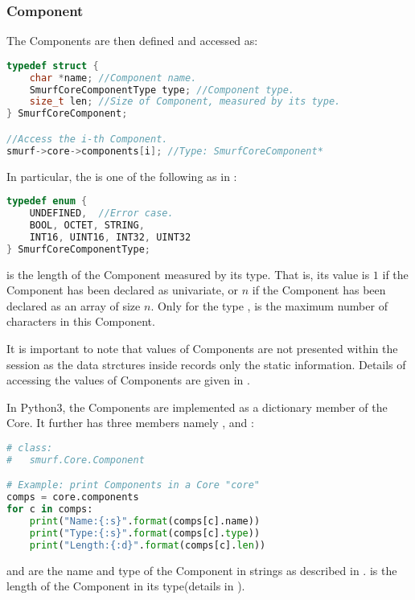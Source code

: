 \subsubsection{Component} 
The Components are then defined and accessed as:
\begin{lstlisting}[language=C++, caption={struct SmurfCoreComponent\label{api:ComponentC}}]
typedef struct {
	char *name; //Component name.
	SmurfCoreComponentType type; //Component type.
	size_t len; //Size of Component, measured by its type.
} SmurfCoreComponent;

//Access the i-th Component.
smurf->core->components[i]; //Type: SmurfCoreComponent*
\end{lstlisting}

In particular, the  is one of the following as in :
\begin{lstlisting}[language=C++, caption={enum SmurfCoreComponentType\label{api:ComponentTypeC}}]
typedef enum {
	UNDEFINED, 	//Error case.
	BOOL, OCTET, STRING, 
	INT16, UINT16, INT32, UINT32
} SmurfCoreComponentType;
\end{lstlisting}

 is the length of the Component measured by its type. That is, its value is $1$ if the Component has been declared as univariate, or $n$ if the Component has been declared as an array of size $n$. Only for the type ,  is the maximum number of characters in this Component.

It is important to note that values of Components are not presented within the session  as the data strctures inside  records only the static information. Details of accessing the values of Components are given in .

In Python3, the Components are implemented as a dictionary member of the Core. It further has three members namely ,  and :
\begin{lstlisting}[language=Python,caption={smurf.Core.components\label{api:Core.componentsP}}]
# class:
#	smurf.Core.Component

# Example: print Components in a Core "core"
comps = core.components
for c in comps:
	print("Name:{:s}".format(comps[c].name))
	print("Type:{:s}".format(comps[c].type))
	print("Length:{:d}".format(comps[c].len))
\end{lstlisting}
 and  are the name and type of the Component in strings as described in .  is the length of the Component in its type(details in ).


